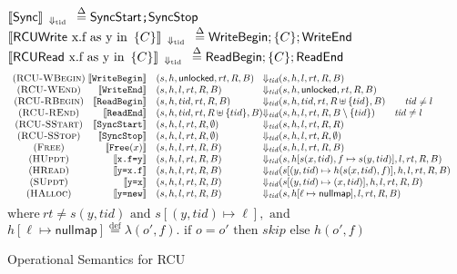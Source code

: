 \begin{figure*}\scriptsize%
  \grammar
   $\llbracket\textsf{Sync}\rrbracket_{\;\;\Downarrow_{\mathrm{tid}}\;\;} \overset{\Delta}{=} \texttt{\textsf{SyncStart};\textsf{SyncStop}}$ \\
  $\llbracket\textsf{RCUWrite} \text{ x.f as y in }\, \{ C \}\rrbracket_{\;\;\Downarrow_{\mathrm{tid}}\;\;} \overset{\Delta}{=} \texttt{\textsf{WriteBegin}} ; \{C\} ;\textsf{WriteEnd}$\\
  $\llbracket\textsf{RCURead} \text{ x.f as y in }\, \{ C \}\rrbracket_{\;\;\Downarrow_{\mathrm{tid}}\;\;} \overset{\Delta}{=} \texttt{\textsf{ReadBegin}}; \{C\} ;\textsf{ReadEnd}$
\[\begin{array}{c@{\;}rl@{\Downarrow_{\mathit{tid}}}ll} 
(\textsc{RCU-WBegin}) & \llbracket\texttt{WriteBegin}\rrbracket & (s,h,\mathsf{unlocked},rt,R,B) &(s,h,l,rt,R,B) & \\
(\textsc{RCU-WEnd}) & \llbracket\texttt{WriteEnd}\rrbracket & (s,h,l,rt,R,B) & (s,h,\mathsf{unlocked},rt,R,B) & \\
(\textsc{RCU-RBegin}) & \llbracket\texttt{ReadBegin}\rrbracket & (s,h,tid,rt,R,B) & (s,h,tid,rt,R\uplus \{tid\},B) \qquad \mathit{tid} \neq l &  \\
(\textsc{RCU-REnd}) & \llbracket\texttt{ReadEnd}\rrbracket & (s,h,tid,rt,R\uplus\{tid\},B) & (s,h,l,rt,R,B\setminus \{tid\}) \qquad  \mathit{tid} \neq l& \\
(\textsc{RCU-SStart}) & \llbracket\texttt{SyncStart}\rrbracket & (s,h,l,rt,R,\emptyset) & (s,h,l,rt,R,R) &\\  %
(\textsc{RCU-SStop}) & \llbracket\texttt{SyncStop}\rrbracket & (s,h,l,rt,R,\emptyset) & (s,h,l,rt,R,\emptyset) &  \\
(\textsc{Free}) & {\llbracket\texttt{Free}(x)\rrbracket} & (s,h,l,rt,R,B) & (s,h,l,rt,R,B ) & \\
(\textsc{HUpdt}) & \llbracket\texttt{x.f=y}\rrbracket   &(s,h,l,rt,R,B)& (s,h[s(x,tid),f \mapsto s(y,tid)],l,rt,R,B) &\\
(\textsc{HRead})   & \llbracket\texttt{y=x.f}\rrbracket   &(s,h,l,rt,R,B)& (s[(y,tid) \mapsto h(s(x,tid),f)],h,l,rt,R,B) & \\
(\textsc{SUpdt}) & \llbracket\texttt{y=x}\rrbracket     &(s,h,l,rt,R,B)& (s[(y,tid) \mapsto (x,tid)],h,l,rt,R,B) &\\
(\textsc{HAlloc}) & \llbracket\texttt{y=new}\rrbracket &(s,h,l,rt,R,B)& (s,h[\ell\mapsto\mathsf{nullmap}],l,rt,R,B) & 
\end{array}\]
$\textrm{where}~ rt \neq s(y,tid) \textrm{ and } s[(y,tid) \mapsto \ell], \textrm{ and }$
$h[\ell \mapsto \mathsf{nullmap}] \overset{\mathrm{def}}{=} \lambda (o',f) . \textrm{ if } o=o' \textrm{ then } skip \textrm{ else } h(o',f) $
\caption{Operational Semantics for \textsf{RCU}}
\label{fig:operationalsemrcu}
\vspace{-2mm}
\end{figure*}%

